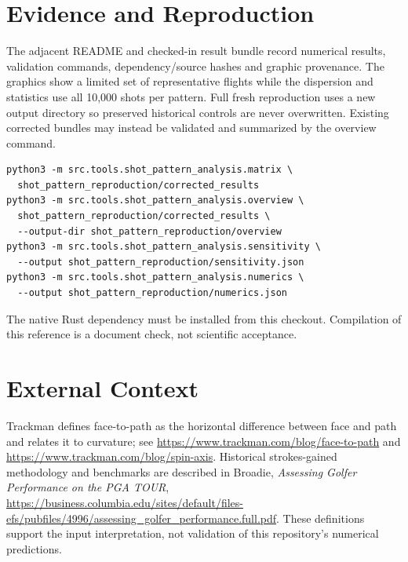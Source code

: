 \documentclass[11pt,letterpaper]{article}
\begin{document}
\section{Evidence and Reproduction}
The adjacent README and checked-in result bundle record numerical results,
validation commands, dependency/source hashes and graphic provenance.
The graphics show a limited set of representative flights while the
dispersion and statistics use all 10,000 shots per pattern. Full fresh reproduction uses a new output directory so preserved historical
controls are never overwritten. Existing corrected bundles may instead be
validated and summarized by the overview command.
\begin{verbatim}
python3 -m src.tools.shot_pattern_analysis.matrix \
  shot_pattern_reproduction/corrected_results
python3 -m src.tools.shot_pattern_analysis.overview \
  shot_pattern_reproduction/corrected_results \
  --output-dir shot_pattern_reproduction/overview
python3 -m src.tools.shot_pattern_analysis.sensitivity \
  --output shot_pattern_reproduction/sensitivity.json
python3 -m src.tools.shot_pattern_analysis.numerics \
  --output shot_pattern_reproduction/numerics.json
\end{verbatim}
The native Rust dependency must be installed from this checkout. Compilation
of this reference is a document check, not scientific acceptance.

\section{External Context}
Trackman defines face-to-path as the horizontal difference between face and
path and relates it to curvature; see
\url{https://www.trackman.com/blog/face-to-path} and
\url{https://www.trackman.com/blog/spin-axis}.
Historical strokes-gained methodology and benchmarks are described in
Broadie, \emph{Assessing Golfer Performance on the PGA TOUR},
\url{https://business.columbia.edu/sites/default/files-efs/pubfiles/4996/assessing_golfer_performance.full.pdf}.
These definitions support the input interpretation, not validation of this
repository's numerical predictions.
\end{document}

